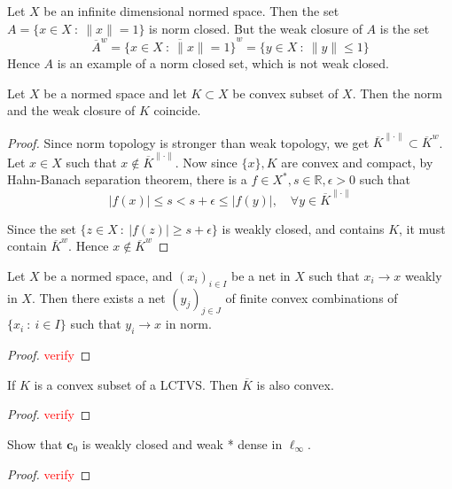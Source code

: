 
\begin{example}
  Let $X$ be an infinite dimensional normed space. Then the set $A = \{ x
  \in X  \ : \  \|x\| = 1 \}$ is norm closed. But the weak closure of
  $A$ is the set \[
    \overline{ A}^w  = \overline{\{ x \in X  \ : \  \|x\| = 1 \}}^{w}
    = \{ y \in X  \ : \  \|y\| \le 1 \}
  \]
  Hence $A$ is an example of a norm closed set, which is not weak closed.
\end{example}

\begin{theorem}
  Let $X$ be a normed space and let $K \subset X$ be convex subset of
  $X$. Then the norm and the weak closure of $K$ coincide.
\end{theorem}
\begin{proof}
  Since norm topology is stronger than weak topology, we get
  $\overline{K}^{\|\cdot\|} \subset \overline{ K}^{w}$.
  Let $ x \in X$ such that $x \notin \overline{K}^{\|\cdot\|}$. Now
  since $ \{ x \}, K$ are convex and compact, by Hahn-Banach
  separation theorem, there is a $f \in X^*, s \in \mathbb{R},
  \epsilon > 0$ such that \[
    |f(x)| \le s < s + \epsilon \le |f(y)|, \quad \forall y \in
    \overline{K}^{\|\cdot\|}
  \]

  Since the set $\{ z \in X  \ : \  |f(z)| \ge s + \epsilon \}$ is
  weakly closed, and contains $K$, it must contain $\overline{K}^w$.
  Hence $ x \notin \overline{K}^w$
\end{proof}

\begin{corollary}
  Let $X$ be a normed space, and $(x_i)_{i \in I}$ be a net in $X$
  such that $x_i \to x$ weakly in $X$. Then there exists a net
  $(y_j)_{j \in J}$ of finite convex combinations of $\{ x_i  \ : \ i
  \in I  \}$ such that $y_i \to x$ in norm.
\end{corollary}
\begin{proof}
  \textcolor{red}{verify}
\end{proof}

\begin{proposition}
  If $K$ is a convex subset of a LCTVS. Then $\overline{K}$ is also convex.
\end{proposition}
\begin{proof}
  \textcolor{red}{verify}
\end{proof}

\begin{proposition}
  Show that $\textbf{c}_{0}$ is weakly closed and weak * dense in $\ell_\infty$.
\end{proposition}
\begin{proof}
  \textcolor{red}{verify}
\end{proof}

